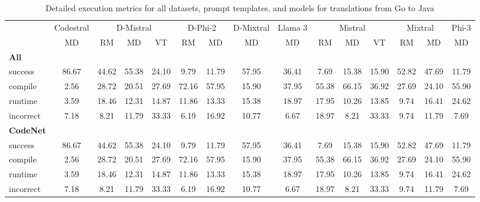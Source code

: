 \begin{table}[t]
\caption{Detailed execution metrics for all datasets, prompt templates, and models for translations from Go to Java}
\label{tab:iteration_1_stats_percent_Go_Java}

\setlength{\tabcolsep}{2.5pt} %
\renewcommand{\arraystretch}{1} %

\footnotesize
\begin{tabular}{@{}lcccccccccccccc@{}}
\toprule
 & Codestral & \multicolumn{3}{c}{D-Mistral} & \multicolumn{2}{c}{D-Phi-2} & D-Mixtral & Llama 3 & \multicolumn{3}{c}{Mistral}  & \multicolumn{2}{c}{Mixtral} & Phi-3 \\ 

\cmidrule(l){2-2}
\cmidrule(l){3-5}
\cmidrule(l){6-7}
\cmidrule(l){8-8}
\cmidrule(l){9-9}
\cmidrule(l){10-12}
\cmidrule(l){13-14}
\cmidrule(l){15-15}

& \multicolumn{1}{c}{MD}
& \multicolumn{1}{c}{RM}
& \multicolumn{1}{c}{MD}
& \multicolumn{1}{c}{VT}
& \multicolumn{1}{c}{RM}
& \multicolumn{1}{c}{MD} 
& \multicolumn{1}{c}{MD} 
& \multicolumn{1}{c}{MD} 
& \multicolumn{1}{c}{RM} 
& \multicolumn{1}{c}{MD} 
& \multicolumn{1}{c}{VT} 
& \multicolumn{1}{c}{RM}
& \multicolumn{1}{c}{MD} 
& \multicolumn{1}{c}{MD} \\

\midrule
\textbf{All} & & & & & & & & & & & & & & \\ 
\quad success & 86.67 & 44.62 & 55.38 & 24.10 & 9.79 & 11.79 & 57.95 & 36.41 & 7.69 & 15.38 & 15.90 & 52.82 & 47.69 & 11.79 \\
\qquad compile & 2.56 & 28.72 & 20.51 & 27.69 & 72.16 & 57.95 & 15.90 & 37.95 & 55.38 & 66.15 & 36.92 & 27.69 & 24.10 & 55.90 \\
\qquad runtime & 3.59 & 18.46 & 12.31 & 14.87 & 11.86 & 13.33 & 15.38 & 18.97 & 17.95 & 10.26 & 13.85 & 9.74 & 16.41 & 24.62 \\
\qquad incorrect & 7.18 & 8.21 & 11.79 & 33.33 & 6.19 & 16.92 & 10.77 & 6.67 & 18.97 & 8.21 & 33.33 & 9.74 & 11.79 & 7.69 \\
 

\textbf{CodeNet} & & & & & & & & & & & & & & \\ 
\quad success & 86.67 & 44.62 & 55.38 & 24.10 & 9.79 & 11.79 & 57.95 & 36.41 & 7.69 & 15.38 & 15.90 & 52.82 & 47.69 & 11.79 \\
\qquad compile & 2.56 & 28.72 & 20.51 & 27.69 & 72.16 & 57.95 & 15.90 & 37.95 & 55.38 & 66.15 & 36.92 & 27.69 & 24.10 & 55.90 \\
\qquad runtime & 3.59 & 18.46 & 12.31 & 14.87 & 11.86 & 13.33 & 15.38 & 18.97 & 17.95 & 10.26 & 13.85 & 9.74 & 16.41 & 24.62 \\
\qquad incorrect & 7.18 & 8.21 & 11.79 & 33.33 & 6.19 & 16.92 & 10.77 & 6.67 & 18.97 & 8.21 & 33.33 & 9.74 & 11.79 & 7.69 \\
 

\bottomrule
\end{tabular}
\end{table}




